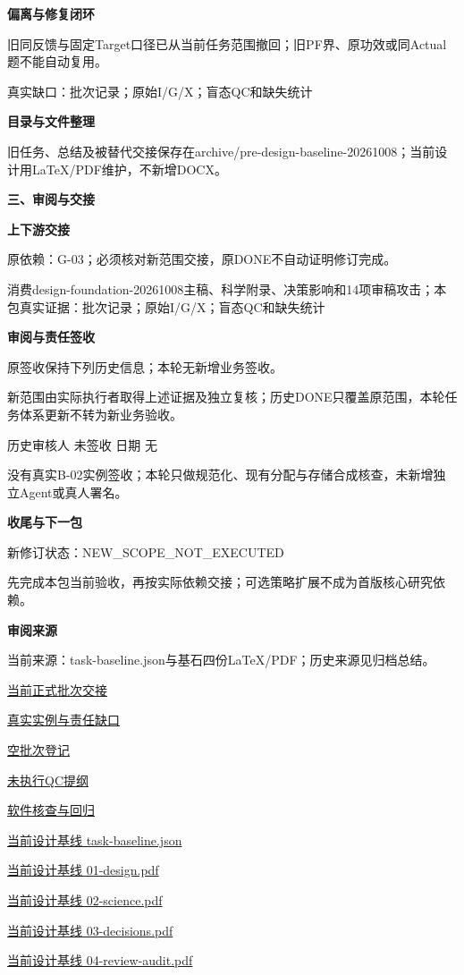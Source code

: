 \documentclass[11pt,a4paper]{article}
\newcommand{\reviewsection}[1]{\par\Needspace{5\baselineskip}\vspace{10pt}\begin{center}{\titlelatin\titlecjk\bfseries\fontsize{14}{20}\selectfont #1}\end{center}}
\newcommand{\reviewsubsection}[1]{\par\Needspace{4\baselineskip}\vspace{4pt}\begin{center}{\titlelatin\titlecjk\bfseries\fontsize{12}{18}\selectfont #1}\end{center}}
\begin{document}
\reviewsubsection{2.3 偏离与修复闭环}
旧同反馈与固定Target口径已从当前任务范围撤回；旧PF界、原功效或同Actual题不能自动复用。


真实缺口：批次记录；原始I/\allowbreak{}G/\allowbreak{}X；盲态QC和缺失统计


\reviewsubsection{2.4 目录与文件整理}
旧任务、总结及被替代交接保存在archive/\allowbreak{}pre-\allowbreak{}design-\allowbreak{}baseline-\allowbreak{}20261008；当前设计用LaTeX/\allowbreak{}PDF维护，不新增DOCX。


\reviewsection{三、审阅与交接}
\reviewsubsection{3.1 上下游交接}
原依赖：G-\allowbreak{}03；必须核对新范围交接，原DONE不自动证明修订完成。


消费design-\allowbreak{}foundation-\allowbreak{}20261008主稿、科学附录、决策影响和14项审稿攻击；本包真实证据：批次记录；原始I/\allowbreak{}G/\allowbreak{}X；盲态QC和缺失统计


\reviewsubsection{3.2 审阅与责任签收}
原签收保持下列历史信息；本轮无新增业务签收。


新范围由实际执行者取得上述证据及独立复核；历史DONE只覆盖原范围，本轮任务体系更新不转为新业务验收。


历史审核人 未签收    日期 无


没有真实B-\allowbreak{}02实例签收；本轮只做规范化、现有分配与存储合成核查，未新增独立Agent或真人署名。


\reviewsubsection{3.3 收尾与下一包}
新修订状态：NEW\_\allowbreak{}SCOPE\_\allowbreak{}NOT\_\allowbreak{}EXECUTED


先完成本包当前验收，再按实际依赖交接；可选策略扩展不成为首版核心研究依赖。


\reviewsubsection{3.4 审阅来源}
当前来源：task-\allowbreak{}baseline.json与基石四份LaTeX/\allowbreak{}PDF；历史来源见归档总结。


\href{file:///D:/Agent/srp/agent/tasks/B-02/outputs/current-batch.md}{当前正式批次交接}


\href{file:///D:/Agent/srp/agent/tasks/B-02/outputs/current-batch.json}{真实实例与责任缺口}


\href{file:///D:/Agent/srp/agent/tasks/B-02/outputs/batch-register-template.csv}{空批次登记}


\href{file:///D:/Agent/srp/agent/tasks/B-02/outputs/batch-qc-template.json}{未执行QC提纲}


\href{file:///D:/Agent/srp/agent/tasks/B-02/evidence/verification.json}{软件核查与回归}


\href{file:///D:/Agent/srp/agent/design/design-foundation-20261008/task-baseline.json}{当前设计基线 task-\allowbreak{}baseline.json}


\href{file:///D:/Agent/srp/agent/design/design-foundation-20261008/01-design.pdf}{当前设计基线 01-\allowbreak{}design.pdf}


\href{file:///D:/Agent/srp/agent/design/design-foundation-20261008/02-science.pdf}{当前设计基线 02-\allowbreak{}science.pdf}


\href{file:///D:/Agent/srp/agent/design/design-foundation-20261008/03-decisions.pdf}{当前设计基线 03-\allowbreak{}decisions.pdf}


\href{file:///D:/Agent/srp/agent/design/design-foundation-20261008/04-review-audit.pdf}{当前设计基线 04-\allowbreak{}review-\allowbreak{}audit.pdf}
\end{document}
